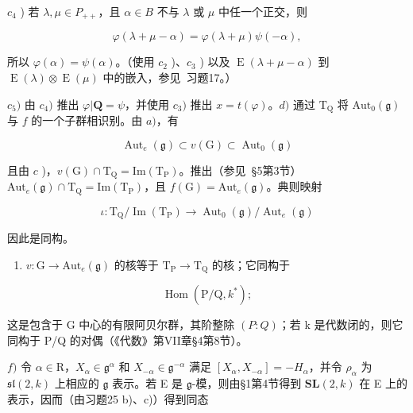 \(c_{4}\) ) 若 \(\lambda, \mu \in P_{++}\)，且 \(\alpha \in B\) 不与 \(\lambda\) 或 \(\mu\) 中任一个正交，则

\[
\varphi (\lambda + \mu - \alpha) = \varphi (\lambda + \mu) \psi (- \alpha),
\]

所以 \(\varphi (\alpha) = \psi (\alpha)\)。（使用 \(c_{2}\) )、\(c_{3}\) ) 以及 \(\operatorname {E}(\lambda +\mu -\alpha)\) 到 \(\operatorname {E}(\lambda)\otimes \operatorname {E}(\mu)\) 中的嵌入，参见~习题17。）

\(c_{5})\) 由 \(c_{4})\) 推出 \(\varphi|\mathbf{Q}=\psi\)，并使用 \(c_{3})\) 推出 \(x=t(\varphi)\)。\(d)\) 通过 \(\mathrm{T}_{\mathrm{Q}}\) 将 \(\mathrm{Aut}_{0}(\mathfrak{g})\) 与 \(f\) 的一个子群相识别。由 \(a)\)，有

\[
\operatorname{Aut} _ {e} (\mathfrak {g}) \subset v (\mathrm{G}) \subset \operatorname{Aut} _ {0} (\mathfrak {g})
\]

且由 \(c\) )，\(v(\mathrm{G}) \cap \mathrm{T}_{\mathrm{Q}} = \mathrm{Im}(\mathrm{T}_{\mathrm{P}})\)。推出（参见~§5第3节）\(\mathrm{Aut}_e(\mathfrak{g}) \cap \mathrm{T}_{\mathrm{Q}} = \mathrm{Im}(\mathrm{T}_{\mathrm{P}})\)，且 \(f(\mathrm{G}) = \mathrm{Aut}_e(\mathfrak{g})\)。典则映射

\[
\iota : \mathrm{T} _ {\mathrm{Q}} / \operatorname{Im} (\mathrm{T} _ {\mathrm{P}}) \to \operatorname{Aut} _ {0} (\mathfrak {g}) / \operatorname{Aut} _ {e} (\mathfrak {g})
\]

因此是同构。

\begin{enumerate}
\def\labelenumi{\alph{enumi})}
\setcounter{enumi}{4}
\tightlist
\item
  \(v: \mathrm{G} \to \mathrm{Aut}_e(\mathfrak{g})\) 的核等于 \(\mathrm{T}_{\mathrm{P}} \to \mathrm{T}_{\mathrm{Q}}\) 的核；它同构于
\end{enumerate}

\[
\operatorname{Hom} (\mathrm{P} / \mathrm{Q}, k ^ {*});
\]

这是包含于 G 中心的有限阿贝尔群，其阶整除 \((P:Q)\)；若 k 是代数闭的，则它同构于 P/Q 的对偶（《代数》第VII章§4第8节）。

\(f)\) 令 \(\alpha \in \mathrm{R}\)，\(X_{\alpha} \in \mathfrak{g}^{\alpha}\) 和 \(X_{-\alpha} \in \mathfrak{g}^{-\alpha}\) 满足 \([X_{\alpha}, X_{-\alpha}] = -H_{\alpha}\)，并令 \(\rho_{\alpha}\) 为 \(\mathfrak{sl}(2, k)\) 上相应的 \(\mathfrak{g}\) 表示。若 E 是 \(\mathfrak{g}\)-模，则由§1第4节得到 \(\mathbf{SL}(2, k)\) 在 E 上的表示，因而（由习题25 b)、c)）得到同态

